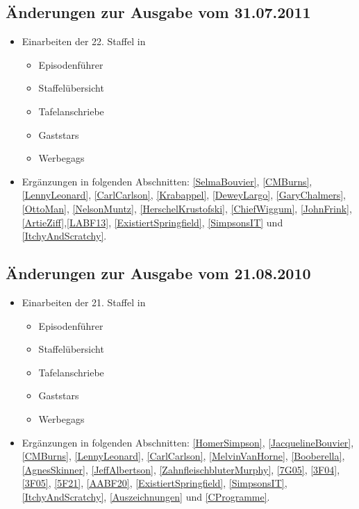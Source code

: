 \documentclass[pagesize,twoside,german]{scrbook}
\begin{document}
\subsection*{Änderungen zur Ausgabe vom 31.07.2011}
\begin{itemize}
\item Einarbeiten der 22. Staffel in
	\begin{itemize}
		\item Episodenführer
		\item Staffelübersicht
		\item Tafelanschriebe
		\item Gaststars
		\item Werbegags
	\end{itemize}
	\item Ergänzungen in folgenden Abschnitten: \ref{SelmaBouvier}, \ref{CMBurns}, \ref{LennyLeonard}, \ref{CarlCarlson}, \ref{Krabappel}, \ref{DeweyLargo}, \ref{GaryChalmers}, \ref{OttoMan}, \ref{NelsonMuntz}, \ref{HerschelKrustofski}, \ref{ChiefWiggum}, \ref{JohnFrink}, \ref{ArtieZiff},\ref{LABF13}, \ref{ExistiertSpringfield}, \ref{SimpsonsIT} und \ref{ItchyAndScratchy}.
\end{itemize}

\subsection*{Änderungen zur Ausgabe vom 21.08.2010}
\begin{itemize}
\item Einarbeiten der 21. Staffel in
	\begin{itemize}
		\item Episodenführer
		\item Staffelübersicht
		\item Tafelanschriebe
		\item Gaststars
		\item Werbegags
	\end{itemize}
	\item Ergänzungen in folgenden Abschnitten: \ref{HomerSimpson}, \ref{JacquelineBouvier}, \ref{CMBurns}, \ref{LennyLeonard}, \ref{CarlCarlson}, \ref{MelvinVanHorne}, \ref{Booberella}, \ref{AgnesSkinner}, \ref{JeffAlbertson}, \ref{ZahnfleischbluterMurphy}, \ref{7G05}, \ref{3F04}, \ref{3F05}, \ref{5F21}, \ref{AABF20}, \ref{ExistiertSpringfield}, \ref{SimpsonsIT}, \ref{ItchyAndScratchy}, \ref{Auszeichnungen} und \ref{CProgramme}.
\end{itemize}
\end{document}
